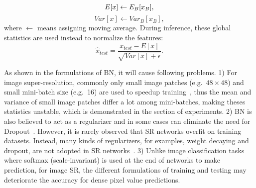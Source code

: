 \documentclass{article}
\begin{document}
\begin{equation}
E[x] \leftarrow E_B[x_B]\\,
\end{equation}
\begin{equation}
Var[x] \leftarrow Var_B[x_B], 
\end{equation}
where \(\leftarrow\) means assigning moving average. During inference, these global statistics are used instead to normalize the features:
\begin{equation}
\hat x_{test} = \frac{x_{test} - E[x]}{\sqrt{Var[x]+\epsilon}}.
\end{equation}

As shown in the formulations of BN, it will cause following problems.
1) For image super-resolution, commonly only small image patches (e.g.\ \(48 \times 48\)) and small mini-batch size (e.g.\ 16) are used to speedup training~\cite{fan2017balanced, kim2016accurate, ledig2016photo, lim2017enhanced, tai2017memnet, tong2017image, 2018arXiv180208797Z}, thus the mean and variance of small image patches differ a lot among mini-batches, making theses statistics unstable, which is demonstrated in the section of experiments.
2) BN is also believed to act as a regularizer and in some cases can eliminate the need for Dropout~\cite{ioffe2015batch}. However, it is rarely observed that SR networks overfit on training datasets. Instead, many kinds of regularizers, for examples, weight decaying and dropout, are not adopted in SR networks~\cite{fan2017balanced, kim2016accurate, ledig2016photo, lim2017enhanced, tai2017memnet, tong2017image, 2018arXiv180208797Z}.
3) Unlike image classification tasks where softmax (scale-invariant) is used at the end of networks to make prediction, for image SR, the different formulations of training and testing may deteriorate the accuracy for dense pixel value predictions.
\end{document}
